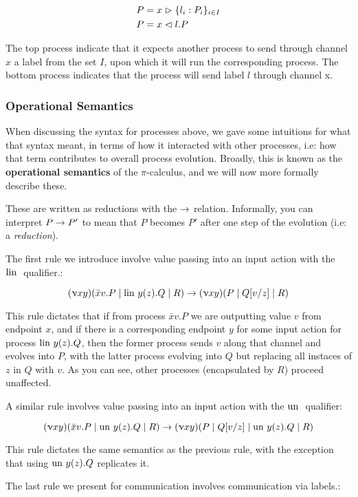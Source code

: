 \begin{align*}
    P &= x \vartriangleright \{l_i : P_i\}_{i \in I} \\
    P &= x \vartriangleleft l.P 
\end{align*}

The top process indicate that it expects another process to send through channel $x$ a label from the set $I$, upon which it will run the corresponding process. The bottom process indicates that the process will send label $l$ through channel x.

\subsubsection{Operational Semantics}

When discussing the syntax for processes above, we gave some intuitions for what that syntax meant, in terms of how it interacted with other processes, i.e: how that term contributes to overall process evolution. Broadly, this is known as the \textbf{operational semantics} of the $\pi$-calculus, and we will now more formally describe these.

These are written as reductions with the $\rightarrow$ relation. Informally, you can interpret $P \rightarrow P'$ to mean that $P$ becomes $P'$ after one step of the evolution (i.e: a \textit{reduction}).

The first rule we introduce involve value passing into an input action with the $\text{lin }$ qualifier.:

$$(\upnu xy)(\bar{x}v.P \mid \text{lin } y(z).Q \mid R) \rightarrow (\upnu xy)(P \mid Q[v/z]\mid R)$$

This rule dictates that if from process $\bar{x}v.P$ we are outputting value $v$ from endpoint $x$, and if there is a corresponding endpoint $y$ for some input action for process $\text{lin } y(z).Q$, then the former process sends $v$ along that channel and evolves into $P$, with the latter process evolving into $Q$ but replacing all instaces of $z$ in $Q$ with $v$. As you can see, other processes (encapsulated by $R$) proceed unaffected.

A similar rule involves value passing into an input action with the $\text{un }$ qualifier:

$$(\upnu xy)(\bar{x}v.P \mid \text{un } y(z).Q \mid R) \rightarrow (\upnu xy)(P \mid Q[v/z]\mid \text{un } y(z).Q \mid R)$$

This rule dictates the same semantics as the previous rule, with the exception that using $\text{un } y(z).Q$ replicates it.

The last rule we present for communication involves communication via labels.:

